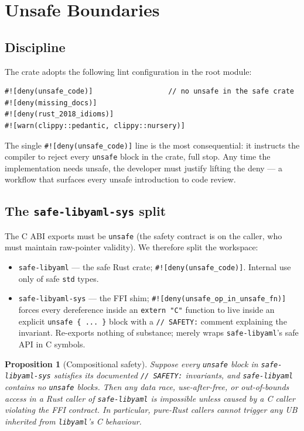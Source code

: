 \documentclass[12pt]{article}
\newtheorem{proposition}[theorem]{Proposition}
\theoremstyle{definition}
\theoremstyle{remark}
\begin{document}
\section{Unsafe Boundaries}
\label{sec:unsafe}

\subsection{Discipline}

The crate adopts the following lint configuration in the root module:

\begin{lstlisting}
#![deny(unsafe_code)]                  // no unsafe in the safe crate
#![deny(missing_docs)]
#![deny(rust_2018_idioms)]
#![warn(clippy::pedantic, clippy::nursery)]
\end{lstlisting}

The single \texttt{\#![deny(unsafe\_code)]} line is the most consequential:
it instructs the compiler to reject every \texttt{unsafe} block in the
crate, full stop. Any time the implementation needs unsafe, the developer
must justify lifting the deny --- a workflow that surfaces every unsafe
introduction to code review.

\subsection{The \texttt{safe-libyaml-sys} split}

The C ABI exports must be \texttt{unsafe} (the safety contract is on the
caller, who must maintain raw-pointer validity). We therefore split the
workspace:

\begin{itemize}[leftmargin=2em]
\item \texttt{safe-libyaml} --- the safe Rust crate; \texttt{\#![deny(unsafe\_code)]}.
Internal use only of safe \texttt{std} types.
\item \texttt{safe-libyaml-sys} --- the FFI shim; \texttt{\#![deny(unsafe\_op\_in\_unsafe\_fn)]}
forces every dereference inside an \texttt{extern "C"} function to live
inside an explicit \texttt{unsafe \{ ... \}} block with a \texttt{// SAFETY:}
comment explaining the invariant. Re-exports nothing of substance; merely
wraps \texttt{safe-libyaml}'s safe API in C symbols.
\end{itemize}

\begin{proposition}[Compositional safety]
\label{prop:compositional-safety}
Suppose every \texttt{unsafe} block in \texttt{safe-libyaml-sys} satisfies its
documented \texttt{// SAFETY:} invariants, and \texttt{safe-libyaml} contains
no \texttt{unsafe} blocks. Then any data race, use-after-free, or
out-of-bounds access in a Rust caller of \texttt{safe-libyaml} is impossible
unless caused by a \emph{C} caller violating the FFI contract. In particular,
pure-Rust callers cannot trigger any UB inherited from \texttt{libyaml}'s C
behaviour.
\end{proposition}
\end{document}
